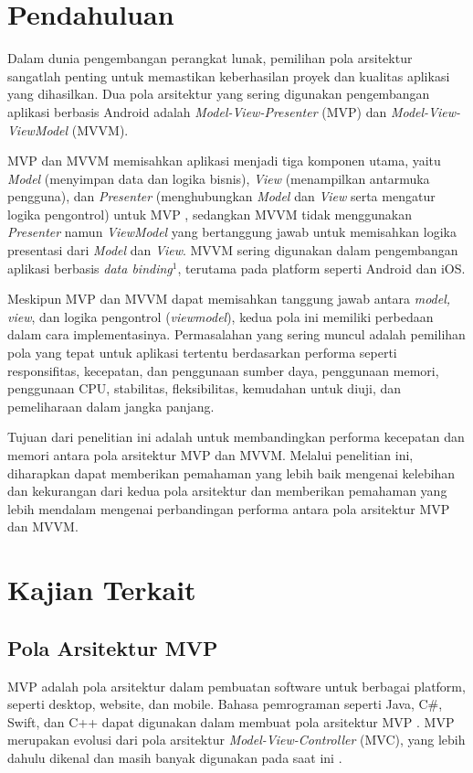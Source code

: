 \documentclass[conference]{IEEEtran}
\begin{document}
	\section{Pendahuluan}
	Dalam dunia pengembangan perangkat lunak, pemilihan pola arsitektur sangatlah penting untuk memastikan keberhasilan proyek dan kualitas aplikasi yang dihasilkan. Dua pola arsitektur yang sering digunakan pengembangan aplikasi berbasis Android adalah \textit{Model-View-Presenter} (MVP) dan \textit{Model-View-ViewModel} (MVVM). 
 
    MVP dan MVVM memisahkan aplikasi menjadi tiga komponen utama, yaitu \textit{Model} (menyimpan data dan logika bisnis), \textit{View} (menampilkan antarmuka pengguna), dan \textit{Presenter} (menghubungkan \textit{Model} dan \textit{View} serta mengatur logika pengontrol) untuk MVP \cite{Dan2020}, sedangkan MVVM tidak menggunakan \textit{Presenter} namun \textit{ViewModel} yang bertanggung jawab untuk memisahkan logika presentasi dari \textit{Model} dan \textit{View}. MVVM sering digunakan dalam pengembangan aplikasi berbasis \textit{data binding}$^1$, terutama pada platform seperti Android dan iOS. 
	
	Meskipun MVP dan MVVM dapat memisahkan tanggung jawab antara \textit{model, view}, dan logika pengontrol (\textit{viewmodel}), kedua pola ini memiliki perbedaan dalam cara implementasinya. Permasalahan yang sering muncul adalah pemilihan pola yang tepat untuk aplikasi tertentu berdasarkan performa seperti responsifitas, kecepatan, dan penggunaan sumber daya, penggunaan memori, penggunaan CPU, stabilitas, fleksibilitas, kemudahan untuk diuji, dan pemeliharaan dalam jangka panjang.
	
	Tujuan dari penelitian ini adalah untuk membandingkan performa kecepatan dan memori antara pola arsitektur MVP dan MVVM. Melalui penelitian ini, diharapkan dapat memberikan pemahaman yang lebih baik mengenai kelebihan dan kekurangan dari kedua pola arsitektur dan memberikan pemahaman yang lebih mendalam mengenai perbandingan performa antara pola arsitektur MVP dan MVVM.

    \thispagestyle{firstpagestyle}
	
	\section{Kajian Terkait}
	\subsection{Pola Arsitektur MVP}
	MVP adalah pola arsitektur dalam pembuatan software untuk berbagai platform, seperti desktop, website, dan mobile. Bahasa pemrograman seperti Java, C\#, Swift, dan C++ dapat digunakan dalam membuat pola arsitektur MVP \cite{mfd2023}. MVP merupakan evolusi dari pola arsitektur \textit{Model-View-Controller} (MVC), yang lebih dahulu dikenal dan masih banyak digunakan pada saat ini \cite{Kom2022, Dan2020}. 
	
\end{document}
